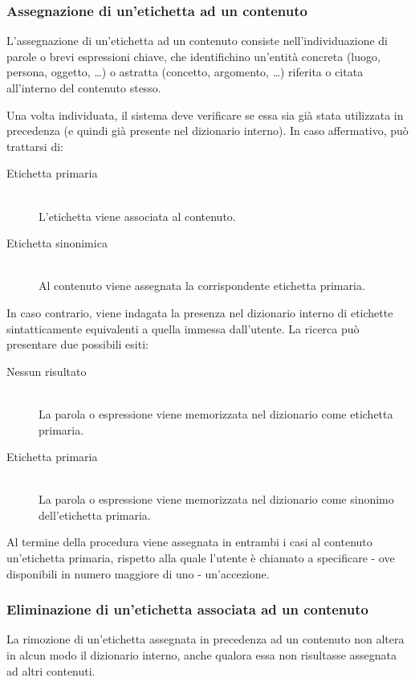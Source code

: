 \documentclass[10pt,a4paper,headinclude,footinclude,hidelinks]{scrreprt} %
\begin{document}
	\subsubsection{Assegnazione di un'etichetta ad un contenuto}
	L'assegnazione di un'etichetta ad un contenuto consiste nell'individuazione di parole o brevi espressioni chiave, che identifichino un'entità concreta (luogo, persona, oggetto, \ldots) o astratta (concetto, argomento, \ldots) riferita o citata all'interno del contenuto stesso.
	
	Una volta individuata, il sistema deve verificare se essa sia già stata utilizzata in precedenza (e quindi già presente nel dizionario interno). In caso affermativo, può trattarsi di:
	\begin{description}
	\item[Etichetta primaria] \hfill \\
	L'etichetta viene associata al contenuto.
	\item[Etichetta sinonimica] \hfill \\
	Al contenuto viene assegnata la corrispondente etichetta primaria.
	\end{description}

	In caso contrario, viene indagata la presenza nel dizionario interno di etichette sintatticamente equivalenti a quella immessa dall'utente. La ricerca può presentare due possibili esiti:
	\begin{description}
	\item[Nessun risultato] \hfill \\
	La parola o espressione viene memorizzata nel dizionario come etichetta primaria.
	\item[Etichetta primaria] \hfill \\
	La parola o espressione viene memorizzata nel dizionario come sinonimo dell'etichetta primaria.
	\end{description}

	Al termine della procedura viene assegnata in entrambi i casi al contenuto un'etichetta primaria, rispetto alla quale l'utente è chiamato a specificare - ove disponibili in numero maggiore di uno - un'accezione.
	\subsubsection{Eliminazione di un'etichetta associata ad un contenuto}
	La rimozione di un'etichetta assegnata in precedenza ad un contenuto non altera in alcun modo il dizionario interno, anche qualora essa non risultasse assegnata ad altri contenuti.
\end{document}
